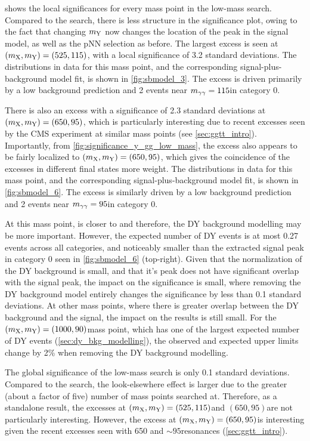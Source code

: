  shows the local significances for every mass point in the low-mass \XYggHtt search. Compared to the \XYttHgg search, there is less structure in the significance plot, owing to the fact that changing $m_{\mathrm{Y}}$ now changes the location of the \mgg peak in the signal model, as well as the pNN selection as before. The largest excess is seen at $(m_{\mathrm{X}},m_{\mathrm{Y}})=(525,115)$\GeV, with a local significance of 3.2 standard deviations. The \mgg distributions in data for this mass point, and the corresponding signal-plus-background model fit, is shown in \cref{fig:sbmodel_3}. The excess is driven primarily by a low background prediction and 2 events near $m_{\gamma\gamma}=115$\GeV in category 0. 



There is also an excess with a significance of 2.3 standard deviations at $(m_{\mathrm{X}}, m_{\mathrm{Y}}) = (650, 95)$\GeV, which is particularly interesting due to recent excesses seen by the CMS experiment at similar mass points (see \cref{sec:ggtt_intro}). Importantly, from \cref{fig:significance_y_gg_low_mass}, the excess also appears to be fairly localized to $(m_{\mathrm{X}}, m_{\mathrm{Y}}) = (650, 95)$\GeV, which gives the coincidence of the excesses in different final states more weight. The \mgg distributions in data for this mass point, and the corresponding signal-plus-background model fit, is shown in \cref{fig:sbmodel_6}. The excess is similarly driven by a low background prediction and 2 events near $m_{\gamma\gamma}=95$\GeV in category 0.



At this mass point, \mY is closer to \mZ and therefore, the DY background modelling may be more important. However, the expected number of DY events is at most 0.27 events across all categories, and noticeably smaller than the extracted signal peak in category 0 seen in \cref{fig:sbmodel_6} (top-right). Given that the normalization of the DY background is small, and that it's peak does not have significant overlap with the signal peak, the impact on the significance is small, where removing the DY background model entirely changes the significance by less than 0.1 standard deviations. At other mass points, where there is greater overlap between the DY background and the signal, the impact on the results is still small. For the $(m_{\mathrm{X}}, m_{\mathrm{Y}}) = (1000, 90)$\GeV mass point, which has one of the largest expected number of DY events (\cref{sec:dy_bkg_modelling}), the observed and expected upper limits change by 2\% when removing the DY background modelling.

The global significance of the low-mass \XYggHtt search is only 0.1 standard deviations. Compared to the \XYttHgg search, the look-elsewhere effect is larger due to the greater (about a factor of five) number of mass points searched at. Therefore, as a standalone result, the excesses at $(m_{\mathrm{X}},m_{\mathrm{Y}})=(525,115)$\GeV and $(650,95)$\GeV are not particularly interesting. However, the excess at $(m_{\mathrm{X}},m_{\mathrm{Y}})=(650,95)$\GeV is interesting given the recent excesses seen with 650 and $\sim95$\GeV resonances (\cref{sec:ggtt_intro}).  

